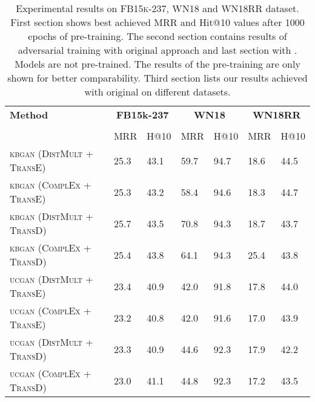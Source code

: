 \begin{table}[h]
    \centering
    \begin{tabular}{lllllll}
        \toprule
        \textbf{Method} &
        \multicolumn{2}{c}{\textbf{FB15k-237}} & 
        \multicolumn{2}{c}{\textbf{WN18}} & 
        \multicolumn{2}{c}{\textbf{WN18RR}}\\
        
        \cmidrule{2-6} \cmidrule{7-7} \\
        {} & MRR & H@10 & MRR & H@10 & MRR & H@10 \\
        
        \midrule
         
          \textsc{kbgan} (\textsc{DistMult} + \textsc{TransE})  
          & 25.3 & 43.1 & 59.7 & 94.7 & 18.6 & 44.5 \\
          
          \textsc{kbgan} (\textsc{ComplEx} + \textsc{TransE})  
          & 25.3 & 43.2 & 58.4 & 94.6 & 18.3 & 44.7 \\
          
          \textsc{kbgan} (\textsc{DistMult} + \textsc{TransD})  
          & 25.7 & 43.5 & 70.8 & 94.3 & 18.7 & 43.7 \\

          \textsc{kbgan} (\textsc{ComplEx} + \textsc{TransD})  
          & 25.4 & 43.8 & 64.1 & 94.3 & 25.4 & 43.8 \\
          
          \midrule
          
          \textsc{ucgan} (\textsc{DistMult} + \textsc{TransE}) 
          & 23.4  & 40.9 & 42.0 & 91.8 & 17.8 & 44.0\\
         
         \textsc{ucgan} (\textsc{ComplEx} + \textsc{TransE}) 
          & 23.2  & 40.8 & 42.0 & 91.6 & 17.0 & 43.9 \\
          
          \textsc{ucgan} (\textsc{DistMult} + \textsc{TransD}) 
          & 23.3 & 40.9 & 44.6 & 92.3 & 17.9 & 42.2 \\
        
        \textsc{ucgan} (\textsc{ComplEx} + \textsc{TransD}) 
          & 23.0  & 41.1 & 44.8 & 92.3 & 17.2 & 43.5 \\
          
        \bottomrule
    \end{tabular}
    \caption{Experimental results on \textsc{FB15k-237}, \textsc{WN18} and \textsc{WN18RR} dataset.
    First section shows best achieved MRR and Hit@10 values after 1000 epochs of pre-training.
    The second section contains results of adversarial training with original \kbgan approach and last section with \usgan.
    Models are not pre-trained. 
    The results of the pre-training are only shown for better comparability.
    Third section lists our results achieved with original \kbgan on different datasets.}
\label{tab:results}
\end{table}